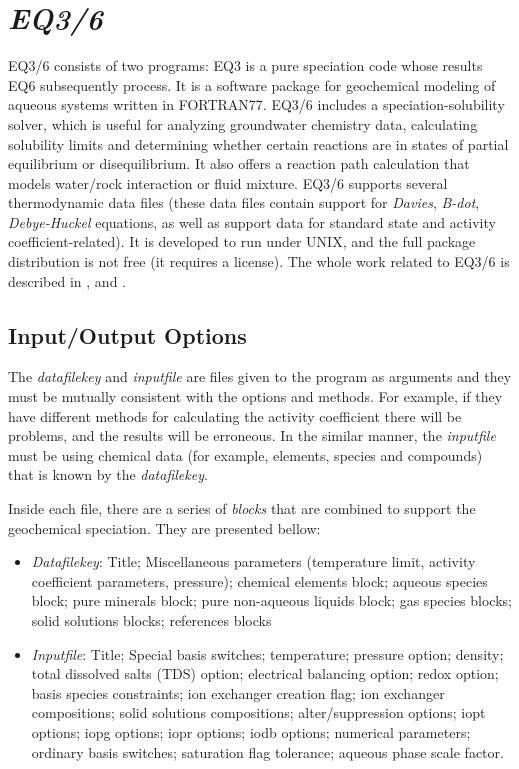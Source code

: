 \section{\emph{EQ3/6}}
EQ3/6 consists of two programs: EQ3 is a pure speciation code whose results EQ6 subsequently process. It is a software package for geochemical modeling of aqueous systems written in FORTRAN77. 
EQ3/6 includes a speciation-solubility solver, which is useful for analyzing groundwater chemistry data, calculating solubility limits and determining whether certain reactions are in states of partial equilibrium or disequilibrium. It also offers a reaction path calculation that models water/rock interaction or fluid mixture. 
EQ3/6 supports several thermodynamic data files (these data files contain support for \emph{Davies}, \emph{B-dot}, \emph{Debye-Huckel} equations, as well as support data for standard state and activity coefficient-related). 
It is developed to run under UNIX, and the full package distribution is not free (it requires a license). The whole work related to EQ3/6 is described in \cite{Wolery:1979}, \cite{Wolery:1990} and \cite{Wolery:1992}.

\subsection{Input/Output Options}
The \emph{datafilekey} and \emph{inputfile} are files given to the program as arguments and they must be mutually consistent with the options and methods. For example, if they have different methods for calculating the activity coefficient there will be problems, and the results will be erroneous. In the similar manner, the \emph{inputfile} must be using chemical data (for example, elements, species and compounds) that is known by the \emph{datafilekey}.

Inside each file, there are a series of \emph{blocks} that are combined to support the geochemical speciation. They are presented bellow:
\begin{itemize}
\item \emph{Datafilekey}: Title; Miscellaneous parameters (temperature limit, activity coefficient parameters, pressure); chemical elements block; aqueous species block; pure minerals block; pure non-aqueous liquids block; gas species blocks; solid solutions blocks; references blocks
\item \emph{Inputfile}: Title; Special basis switches; temperature; pressure option; density; total dissolved salts (TDS) option; electrical balancing option; redox option; basis species constraints; ion exchanger creation flag; ion exchanger compositions; solid solutions compositions; alter/suppression options; iopt options; iopg options; iopr options; iodb options; numerical parameters; ordinary basis switches; saturation flag tolerance; aqueous phase scale factor.
\end{itemize}

